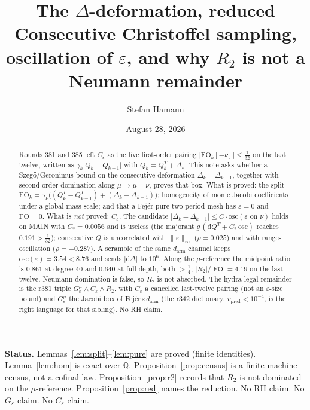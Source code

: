 \documentclass[11pt]{article}
\title{\bfseries The $\Delta$-deformation, reduced\\[2mm]
\large Consecutive Christoffel sampling, oscillation of $\varepsilon$,
and why $R_2$ is not a Neumann remainder}
\author{Stefan Hamann}
\date{August 28, 2026}
\theoremstyle{remark}
\newcommand{\Q}{\mathbb{Q}}
\begin{document}
\maketitle

\begin{abstract}\noindent
Rounds 381 and 385 left $C_\varepsilon$ as the live first-order pairing
$\lvert\mathrm{FO}_k[-\nu]\rvert\le\tfrac1{32}$ on the last twelve, written
as $\gamma_k\lvert Q_k-Q_{k-1}\rvert$ with
$Q_k=Q_k^T+\Delta_k$.
This note asks whether a Szeg\H{o}/Geronimus bound on the consecutive
deformation $\Delta_k-\Delta_{k-1}$, together with second-order domination
along $\mu\to\mu-\nu$, proves that box.
What is proved: the split
$\mathrm{FO}_k=\gamma_k\bigl((Q_k^T-Q_{k-1}^T)+(\Delta_k-\Delta_{k-1})\bigr)$;
homogeneity of monic Jacobi coefficients under a global mass scale;
and that a Fej\'er-pure two-period mesh has $\varepsilon=0$ and
$\mathrm{FO}=0$.
What is \emph{not} proved: $C_\varepsilon$.
The candidate $\lvert\Delta_k-\Delta_{k-1}\rvert\le C\cdot\mathrm{osc}(\varepsilon\text{ on }\nu)$
holds on MAIN with $C_*=0.0056$ and is useless (the majorant
$g\,(\mathrm{d}Q^T+C_*\,\mathrm{osc})$ reaches $0.191>\tfrac1{32}$);
consecutive $Q$ is uncorrelated with $\lVert\varepsilon\rVert_\infty$
($\rho=0.025$) and with range-oscillation ($\rho=-0.287$).
A scramble of the same $d_{\mathrm{arm}}$ channel keeps
$\mathrm{osc}(\varepsilon)=3.54<8.76$ and sends $\lvert\mathrm{d}\Delta\rvert$
to $10^6$.
Along the $\mu$-reference the midpoint ratio is $0.861$ at degree $40$
and $0.640$ at full depth, both $>\tfrac14$;
$\lvert R_2\rvert/\lvert\mathrm{FO}\rvert=4.19$ on the last twelve.
Neumann domination is false, so $R_2$ is not absorbed.
The hydra-legal remainder is the r381 triple
$G_\varepsilon^\mu\wedge C_\varepsilon\wedge R_2$, with $C_\varepsilon$
a cancelled last-twelve pairing (not an $\varepsilon$-size bound) and
$G_\varepsilon^\mu$ the Jacobi box of Fej\'er$\times d_{\mathrm{arm}}$
(the r342 dictionary, $v_{\mathrm{pred}}<10^{-4}$, is the right language
for that sibling).
No RH claim.
\end{abstract}

\medskip\noindent
\textbf{Status.}\enspace
Lemmas~\ref{lem:split}--\ref{lem:pure} are proved (finite identities).
Lemma~\ref{lem:hom} is exact over $\Q$.
Proposition~\ref{prop:census} is a finite machine census, not a cofinal law.
Proposition~\ref{prop:r2} records that $R_2$ is not dominated on the
$\mu$-reference.
Proposition~\ref{prop:red} names the reduction.
No RH claim.  No $G_\varepsilon$ claim.  No $C_\varepsilon$ claim.
\end{document}
